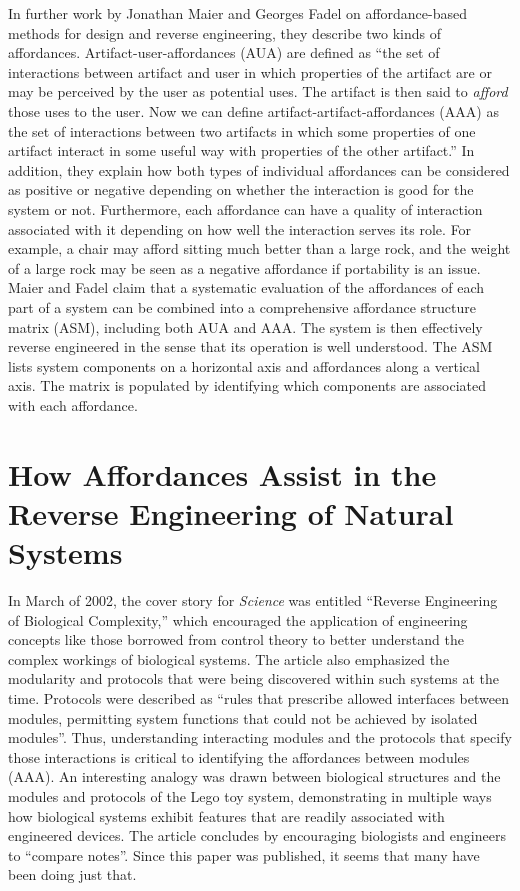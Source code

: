 In further work by Jonathan Maier and Georges Fadel on affordance-based
methods for design and reverse engineering, they describe two kinds of
affordances. Artifact-user-affordances (AUA) are defined as “the set of
interactions between artifact and user in which properties of the
artifact are or may be perceived by the user as potential uses. The
artifact is then said to \textit{afford} those uses to the user. Now we
can define artifact-artifact-affordances (AAA) as the set of
interactions between two artifacts in which some properties of one
artifact interact in some useful way with properties of the other
artifact.”\citep{maierfadel2003} In addition, they explain how both types
of individual affordances can be considered as positive or negative
depending on whether the interaction is good for the system or not.
Furthermore, each affordance can have a quality of interaction
associated with it depending on how well the interaction serves its
role. For example, a chair may afford sitting much better than a large
rock, and the weight of a large rock may be seen as a negative
affordance if portability is an issue. Maier and Fadel claim that a
systematic evaluation of the affordances of each part of a system can
be combined into a comprehensive affordance structure matrix (ASM),
including both AUA and AAA.\citep{maieretal2003}\citep{maieretal2008} The system is then
effectively reverse engineered in the sense that its operation is well
understood. The ASM lists system components on a horizontal axis and
affordances along a vertical axis. The matrix is populated by
identifying which components are associated with each affordance.

\section{How Affordances Assist in the Reverse Engineering of Natural Systems}

In March of 2002, the cover story for \textit{Science} was entitled
“Reverse Engineering of Biological Complexity,”\citep{csetedoyle2002}
which encouraged the application of engineering concepts like those
borrowed from control theory to better understand the complex workings
of biological systems. The article also emphasized the modularity and
protocols that were being discovered within such systems at the time.
Protocols were described as “rules that prescribe allowed interfaces
between modules, permitting system functions that could not be achieved
by isolated modules”. Thus, understanding interacting modules and the
protocols that specify those interactions is critical to identifying
the affordances between modules (AAA). An interesting analogy was drawn
between biological structures and the modules and protocols of the Lego
toy system, demonstrating in multiple ways how biological systems
exhibit features that are readily associated with engineered devices.
The article concludes by encouraging biologists and engineers to
“compare notes”. Since this paper was published, it seems that many
have been doing just that. 

